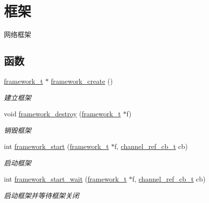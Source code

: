 \hypertarget{a00093}{}\section{框架}
\label{a00093}


网络框架  


\subsection*{函数}
\begin{DoxyCompactItemize}
\item 
\hyperlink{a00047_a6149d769f6f07ed14a40a271c95d8463_a6149d769f6f07ed14a40a271c95d8463}{framework\+\_\+t} $\ast$ \hyperlink{a00093_ga90b29a0c500209cb9b37437a32188a40_ga90b29a0c500209cb9b37437a32188a40}{framework\+\_\+create} ()
\begin{DoxyCompactList}\small\item\em 建立框架 \end{DoxyCompactList}\item 
void \hyperlink{a00093_gad1b6cb17014bfc515f8861bad3198e22_gad1b6cb17014bfc515f8861bad3198e22}{framework\+\_\+destroy} (\hyperlink{a00047_a6149d769f6f07ed14a40a271c95d8463_a6149d769f6f07ed14a40a271c95d8463}{framework\+\_\+t} $\ast$f)
\begin{DoxyCompactList}\small\item\em 销毁框架 \end{DoxyCompactList}\item 
int \hyperlink{a00093_ga7579f69fe8d0ec6887e4594f52cbb883_ga7579f69fe8d0ec6887e4594f52cbb883}{framework\+\_\+start} (\hyperlink{a00047_a6149d769f6f07ed14a40a271c95d8463_a6149d769f6f07ed14a40a271c95d8463}{framework\+\_\+t} $\ast$f, \hyperlink{a00047_ae296ec4d1ce108960de8dcc423956a1d_ae296ec4d1ce108960de8dcc423956a1d}{channel\+\_\+ref\+\_\+cb\+\_\+t} cb)
\begin{DoxyCompactList}\small\item\em 启动框架 \end{DoxyCompactList}\item 
int \hyperlink{a00093_gadd2b49ff4ff090a4490bd0128d00efba_gadd2b49ff4ff090a4490bd0128d00efba}{framework\+\_\+start\+\_\+wait} (\hyperlink{a00047_a6149d769f6f07ed14a40a271c95d8463_a6149d769f6f07ed14a40a271c95d8463}{framework\+\_\+t} $\ast$f, \hyperlink{a00047_ae296ec4d1ce108960de8dcc423956a1d_ae296ec4d1ce108960de8dcc423956a1d}{channel\+\_\+ref\+\_\+cb\+\_\+t} cb)
\begin{DoxyCompactList}\small\item\em 启动框架并等待框架关闭 \end{DoxyCompactList}\item 

\end{DoxyCompactItemize}
